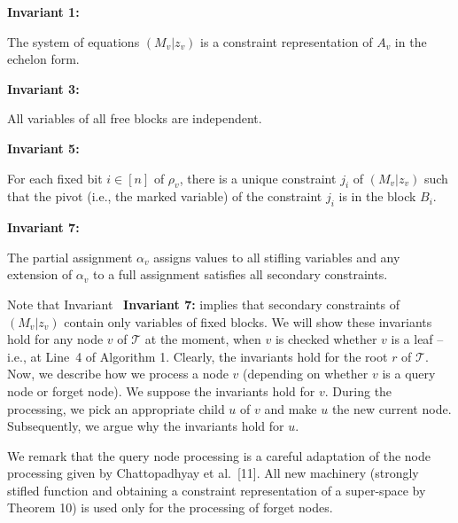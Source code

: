 \textbf{ Invariant 1:}



The system of equations $(M_{v}|z_{v})$ is a constraint representation of $A_{v}$ in the echelon form.\par



\textbf{ Invariant 3:}



All variables of all free blocks are independent.\par



\textbf{ Invariant 5:}



For each fixed bit $i\in[n]$ of $\rho_{v}$, there is a unique constraint $j_{i}$ of $(M_{v}|z_{v})$ such that the pivot (i.e., the marked variable) of the constraint $j_{i}$ is in the block $B_{i}$.\par



\textbf{ Invariant 7:}



The partial assignment $\alpha_{v}$ assigns values to all stifling variables and any extension of $\alpha_{v}$ to a full assignment satisfies all secondary constraints.\par







Note that Invariant \textbf{ Invariant 7:} implies that secondary constraints of $(M_{v}|z_{v})$ contain only variables of fixed blocks.
We will show these invariants hold for any node $v$ of $\mathcal{T}$ at the moment, when $v$ is checked whether $v$ is a leaf – i.e., at Line 4 of Algorithm 1.
Clearly, the invariants hold for the root $r$ of $\mathcal{T}$.
Now, we describe how we process a node $v$ (depending on whether $v$ is a query node or forget node).
We suppose the invariants hold for $v$.
During the processing, we pick an appropriate child $u$ of $v$ and make $u$ the new current node.
Subsequently, we argue why the invariants hold for $u$.\par




We remark that the query node processing is a careful adaptation of the node processing given by Chattopadhyay et al. [11].
All new machinery (strongly stifled function and obtaining a constraint representation of a super-space by Theorem 10) is used only for the processing of forget nodes.\par





